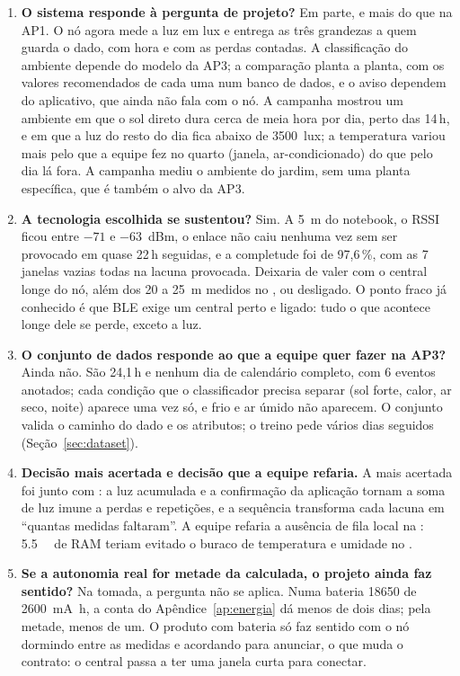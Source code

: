\begin{enumerate}[label=\arabic*.]
  \item \textbf{O sistema responde à pergunta de projeto?} Em parte, e mais
    do que na AP1. O nó agora mede a luz em lux e entrega as três grandezas
    a quem guarda o dado, com hora e com as perdas contadas. A classificação
    do ambiente depende do modelo da AP3; a comparação planta a planta,
    com os valores recomendados de cada uma num banco de dados, e o aviso
    dependem do aplicativo, que ainda não fala com o nó. A campanha mostrou um ambiente
    em que o sol direto dura cerca de meia hora por dia, perto das 14\,h,
    e em que a luz do resto do dia fica abaixo de \SI{3500}{lux}; a
    temperatura variou mais pelo que a equipe fez no quarto (janela,
    ar-condicionado) do que pelo dia lá fora. A campanha mediu o ambiente do jardim, sem
    uma planta específica, que é também o alvo da AP3.
  \item \textbf{A tecnologia escolhida se sustentou?}
    Sim. A \SI{5}{\metre} do notebook, o RSSI ficou entre $-71$ e
    \SI{-63}{dBm}, o enlace não caiu nenhuma vez sem ser provocado em quase
    22\,h seguidas, e a completude foi de 97,6\,\%, com as 7 janelas vazias
    todas na lacuna provocada. Deixaria de valer com o central longe do
    nó, além dos 20 a \SI{25}{\metre} medidos no , ou desligado. O ponto fraco já
    conhecido é que BLE exige um central perto e ligado: tudo o que
    acontece longe dele se perde, exceto a luz.
  \item \textbf{O conjunto de dados responde ao que a equipe quer fazer na
    AP3?} Ainda não. São 24,1\,h e nenhum dia de calendário completo, com 6
    eventos anotados; cada condição que o classificador precisa separar
    (sol forte, calor, ar seco, noite) aparece uma vez só, e frio e ar
    úmido não aparecem. O conjunto valida o caminho do dado e os atributos;
    o treino pede vários dias seguidos (Seção~\ref{sec:dataset}).
  \item \textbf{Decisão mais acertada e decisão que a equipe refaria.} A
    mais acertada foi  junto com : a luz acumulada e a
    confirmação da aplicação tornam a soma de luz imune a perdas e
    repetições, e a sequência transforma cada lacuna em \enquote{quantas
    medidas faltaram}. A equipe refaria a ausência de fila local na
    : \SI{5.5}{\kilo\byte} de RAM teriam evitado o buraco de
    temperatura e umidade no .
  \item \textbf{Se a autonomia real for metade da calculada, o projeto
    ainda faz sentido?} Na tomada, a pergunta não se aplica. Numa bateria
    18650 de \SI{2600}{\milli\ampere\hour}, a conta do
    Apêndice~\ref{ap:energia} dá menos de dois dias; pela metade, menos de
    um. O produto com bateria só faz sentido com o nó dormindo entre as
    medidas e acordando para anunciar, o que muda o contrato: o central
    passa a ter uma janela curta para conectar.
\end{enumerate}
